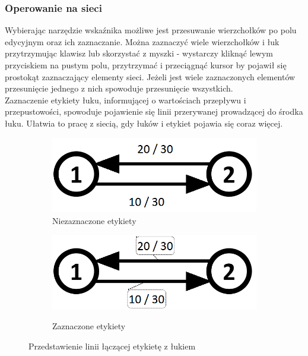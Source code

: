 \subsubsection{Operowanie na sieci}
Wybierając narzędzie wskaźnika możliwe jest przesuwanie wierzchołków po polu edycyjnym oraz ich zaznaczanie. Można zaznaczyć wiele wierzchołków i łuk przytrzymując klawisz \keys{\ctrl} lub skorzystać z myszki - wystarczy kliknąć lewym przyciskiem na pustym polu, przytrzymać i przeciągnąć kursor by pojawił się prostokąt zaznaczający elementy sieci. Jeżeli jest wiele zaznaczonych elementów przesunięcie jednego z nich spowoduje przesunięcie wszystkich.\\\indent
Zaznaczenie etykiety łuku, informującej o wartościach przepływu i przepustowości, spowoduje pojawienie się linii przerywanej prowadzącej do środka łuku. Ułatwia to pracę z siecią, gdy łuków i etykiet pojawia się coraz więcej.
\begin{figure}[H]
	\centering
	\begin{subfigure}{0.45\textwidth}
		\includegraphics[width=0.9\linewidth]{./img/spec_zew05_1.png}
		\caption{Niezaznaczone etykiety}
		\label{fig:grafSelect1}
	\end{subfigure}
	\begin{subfigure}{0.45\textwidth}
		\includegraphics[width=0.9\linewidth]{./img/spec_zew05_2.png}
		\label{fig:grafSelect2}
		\caption{Zaznaczone etykiety}
	\end{subfigure}
	\caption{Przedstawienie linii łączącej etykietę z łukiem}
	\label{fig:grafSelect}
\end{figure}

